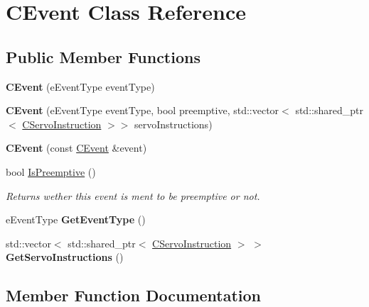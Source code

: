 \hypertarget{classCEvent}{}\section{C\+Event Class Reference}
\label{classCEvent}
\subsection*{Public Member Functions}
\begin{DoxyCompactItemize}
\item 
\mbox{\label{classCEvent_aa6b4336b0297195331fe226481e54052}} 
{\bfseries C\+Event} (e\+Event\+Type event\+Type)
\item 
\mbox{\label{classCEvent_a58a02cb098fc183f477fcee526bd4e9a}} 
{\bfseries C\+Event} (e\+Event\+Type event\+Type, bool preemptive, std\+::vector$<$ std\+::shared\+\_\+ptr$<$ \hyperlink{classCServoInstruction}{C\+Servo\+Instruction} $>$$>$ servo\+Instructions)
\item 
\mbox{\label{classCEvent_a96d5a3bb8bd3d79f97fba150741bc47d}} 
{\bfseries C\+Event} (const \hyperlink{classCEvent}{C\+Event} \&event)
\item 
bool \hyperlink{classCEvent_a82761c13d74df9b3eee88a2ca40e261c}{Is\+Preemptive} ()
\begin{DoxyCompactList}\small\item\em Returns wether this event is ment to be preemptive or not. \end{DoxyCompactList}\item 
\mbox{\label{classCEvent_a225d9123874708df819aa2f377113ac8}} 
e\+Event\+Type {\bfseries Get\+Event\+Type} ()
\item 
\mbox{\label{classCEvent_a02ff282255e304f3a518cd042e50be0e}} 
std\+::vector$<$ std\+::shared\+\_\+ptr$<$ \hyperlink{classCServoInstruction}{C\+Servo\+Instruction} $>$ $>$ {\bfseries Get\+Servo\+Instructions} ()
\end{DoxyCompactItemize}


\subsection{Member Function Documentation}
\mbox{\label{classCEvent_a82761c13d74df9b3eee88a2ca40e261c}} 
